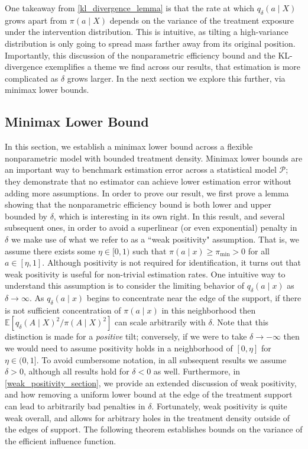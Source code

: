 \documentclass[11pt,twoside]{article}
\theoremstyle{definition}
\theoremstyle{remark}
\begin{document}
One takeaway from \cref{kl_divergence_lemma} is that the rate at which $q_\delta(a \mid X)$ grows apart from $\pi(a \mid X)$ depends on the variance of the treatment exposure under the intervention distribution. This is intuitive, as tilting a high-variance distribution is only going to spread mass farther away from its original position. Importantly, this discussion of the nonparametric efficiency bound and the KL-divergence exemplifies a theme we  find across our results, that estimation is more complicated as $\delta$ grows larger. In the next section we explore this further, via minimax lower bounds. 

\subsection{Minimax Lower Bound} \label{minimax_section}

In this section, we establish a minimax lower bound across a flexible nonparametric model with bounded treatment density. Minimax lower bounds are an important way to benchmark estimation error across a statistical model $\mathcal{P}$; they demonstrate that no estimator can achieve lower estimation error without adding more assumptions. In order to prove our result, we first prove a lemma showing that the nonparametric efficiency bound is both lower and upper bounded by $\delta$, which is interesting in its own right. In this result, and several subsequent ones, in order to avoid a superlinear (or even exponential) penalty in $\delta$ we make use of what we refer to as a ``weak positivity" assumption. That is, we assume there exists some $\eta \in [0, 1)$ such that $\pi(a \mid x) \geq \pi_{\min} > 0$ for all $a \in [\eta, 1]$. Although positivity is not required for identification, it turns out that weak positivity is useful for non-trivial estimation rates. One intuitive way to understand this assumption is to consider the limiting behavior of $q_\delta(a \mid x)$ as $\delta \to \infty$. As $q_\delta(a \mid x)$ begins to concentrate near the edge of the support, if there is not sufficient concentration of $\pi(a \mid x)$ in this neighborhood then $\mathbb{E}\left[q_\delta(A \mid X)^2 / \pi(A \mid X)^2\right]$ can scale arbitrarily with $\delta$. Note that this distinction is made for a \textit{positive} tilt; conversely, if we were to take $\delta \to -\infty$ then we would need to assume positivity holds in a neighborhood of $[0, \eta]$ for $\eta \in (0, 1]$. To avoid cumbersome notation, in all subsequent results we assume $\delta > 0$, although all results hold for $\delta < 0$ as well. Furthermore, in \cref{weak_positivity_section}, we provide an extended discussion of weak positivity, and how removing a uniform lower bound at the edge of the treatment support can lead to arbitrarily bad penalties in $\delta$. Fortunately, weak positivity is quite weak overall, and allows for arbitrary holes in the treatment density outside of the edges of support. The following theorem establishes bounds on the variance of the efficient influence function.
\end{document}
